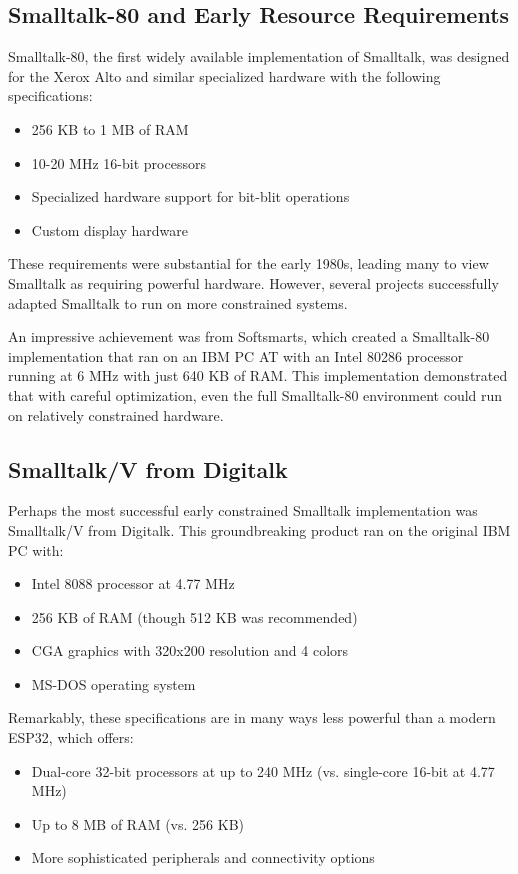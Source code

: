 \documentclass[12pt,a4paper]{report}
\begin{document}
\subsection{Smalltalk-80 and Early Resource Requirements}

Smalltalk-80, the first widely available implementation of Smalltalk, was designed for the Xerox Alto and similar specialized hardware with the following specifications:

\begin{itemize}
    \item 256 KB to 1 MB of RAM
    \item 10-20 MHz 16-bit processors
    \item Specialized hardware support for bit-blit operations
    \item Custom display hardware
\end{itemize}

These requirements were substantial for the early 1980s, leading many to view Smalltalk as requiring powerful hardware. However, several projects successfully adapted Smalltalk to run on more constrained systems.

An impressive achievement was from Softsmarts, which created a Smalltalk-80 implementation that ran on an IBM PC AT with an Intel 80286 processor running at 6 MHz with just 640 KB of RAM. This implementation demonstrated that with careful optimization, even the full Smalltalk-80 environment could run on relatively constrained hardware.

\subsection{Smalltalk/V from Digitalk}

Perhaps the most successful early constrained Smalltalk implementation was Smalltalk/V from Digitalk. This groundbreaking product ran on the original IBM PC with:

\begin{itemize}
    \item Intel 8088 processor at 4.77 MHz
    \item 256 KB of RAM (though 512 KB was recommended)
    \item CGA graphics with 320x200 resolution and 4 colors
    \item MS-DOS operating system
\end{itemize}

Remarkably, these specifications are in many ways less powerful than a modern ESP32, which offers:
\begin{itemize}
    \item Dual-core 32-bit processors at up to 240 MHz (vs. single-core 16-bit at 4.77 MHz)
    \item Up to 8 MB of RAM (vs. 256 KB)
    \item More sophisticated peripherals and connectivity options
\end{itemize}
\end{document}
